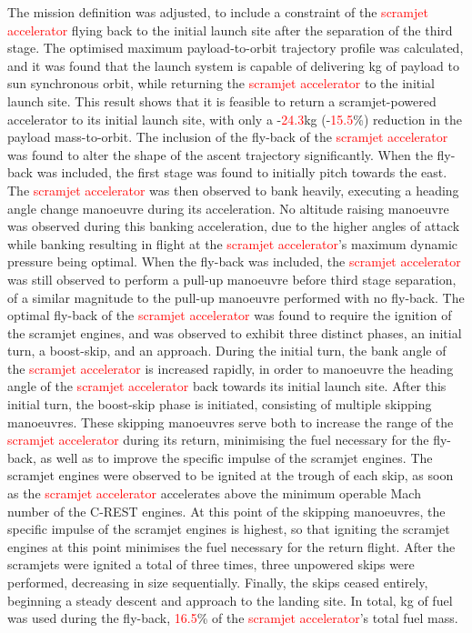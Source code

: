 The mission definition was adjusted, to include a constraint of the \textcolor{red}{scramjet accelerator} flying back to the initial launch site after the separation of the third stage. 
The optimised maximum payload-to-orbit trajectory profile was calculated, and it was found that the launch system is capable of delivering \PayloadToOrbitStandard kg of payload to sun synchronous orbit, while returning the \textcolor{red}{scramjet accelerator} to the initial launch site. This result shows that it is feasible to return a scramjet-powered accelerator to its initial launch site, with only a -\textcolor{red}{24.3}kg (-\textcolor{red}{15.5}\%) reduction in the payload mass-to-orbit.
	The inclusion of the fly-back of the \textcolor{red}{scramjet accelerator} was found to alter the shape of the ascent trajectory significantly. When the fly-back was included, the first stage was found to initially pitch towards the east. The \textcolor{red}{scramjet accelerator} was then observed to bank heavily, executing a heading angle change manoeuvre during its acceleration. No altitude raising manoeuvre was observed during this banking acceleration, due to the higher angles of attack while banking resulting in flight at the \textcolor{red}{scramjet accelerator}'s maximum dynamic pressure being optimal. 
When the fly-back was included, the \textcolor{red}{scramjet accelerator} was still observed to perform a pull-up manoeuvre before third stage separation, of a similar magnitude to the pull-up manoeuvre performed with no fly-back. 
The optimal fly-back of the \textcolor{red}{scramjet accelerator} was found to require the ignition of the scramjet engines, and was observed to exhibit three distinct phases, an initial turn, a boost-skip, and an approach. 
During the initial turn, the bank angle of the \textcolor{red}{scramjet accelerator} is increased rapidly, in order to manoeuvre the heading angle of the \textcolor{red}{scramjet accelerator} back towards its initial launch site. 
After this initial turn, the boost-skip phase is initiated, consisting of multiple skipping manoeuvres. These skipping manoeuvres serve both to increase the range of the \textcolor{red}{scramjet accelerator} during its return, minimising the fuel necessary for the fly-back, as well as to improve the specific impulse of the scramjet engines.
 The scramjet engines were observed to be ignited at the trough of each skip, as soon as the \textcolor{red}{scramjet accelerator} accelerates above the minimum operable Mach number of the C-REST engines. At this point of the skipping manoeuvres, the specific impulse of the scramjet engines is highest, so that igniting the scramjet engines at this point minimises the fuel necessary for the return flight. 
 After the scramjets were ignited a total of three times, three unpowered skips were performed, decreasing in size sequentially. Finally, the skips ceased entirely, beginning a steady descent and approach to the landing site. 
 In total, \returnFuelStandard kg of fuel was used during the fly-back, \textcolor{red}{16.5}\% of the \textcolor{red}{scramjet accelerator}'s total fuel mass.
	
